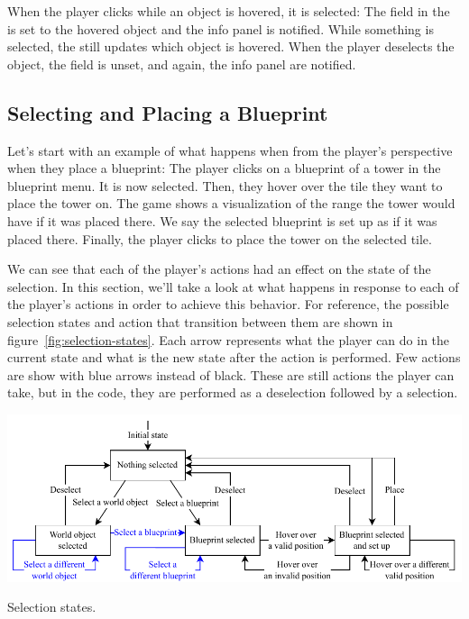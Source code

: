 When the player clicks while an object is hovered, it is selected:
The  field in the  is set to the hovered object and the info panel is notified.
While something is selected, the  still updates which object is hovered.
When the player deselects the object, the field is unset, and again, the info panel are notified.

\subsection{Selecting and Placing a Blueprint}\label{sec:docs-place-blueprint}

Let's start with an example of what happens when from the player's perspective when they place a blueprint:
The player clicks on a blueprint of a tower in the blueprint menu.
It is now selected.
Then, they hover over the tile they want to place the tower on.
The game shows a visualization of the range the tower would have if it was placed there.
We say the selected blueprint is set up as if it was placed there.
Finally, the player clicks to place the tower on the selected tile.

We can see that each of the player's actions had an effect on the state of the selection.
In this section, we'll take a look at what happens in response to each of the player's actions in order to achieve this behavior.
For reference, the possible selection states and action that transition between them are shown in figure~\ref{fig:selection-states}.
Each arrow represents what the player can do in the current state and what is the new state after the action is performed.
Few actions are show with blue arrows instead of black.
These are still actions the player can take, but in the code, they are performed as a deselection followed by a selection.

\begin{center}
    \captionsetup{type=figure}
    \includegraphics[width=\textwidth]{img/selection states.pdf}
    \caption{Selection states.}
    \label{fig:selection-states}
\end{center}


